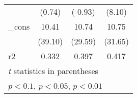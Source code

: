 {\begin{tabular}{l*{3}{c}}
            &      (0.74)         &     (-0.93)         &      (8.10)         \\
[1em]
\_cons      &       10.41\sym{***}&       10.74\sym{***}&       10.75\sym{***}\\
            &     (39.10)         &     (29.59)         &     (31.65)         \\
\hline
r2          &       0.332         &       0.397         &       0.417         \\
\hline\hline
\multicolumn{4}{l}{\footnotesize \textit{t} statistics in parentheses}\\
\multicolumn{4}{l}{\footnotesize \sym{*} \(p<0.1\), \sym{**} \(p<0.05\), \sym{***} \(p<0.01\)}\\
\end{tabular}
}
